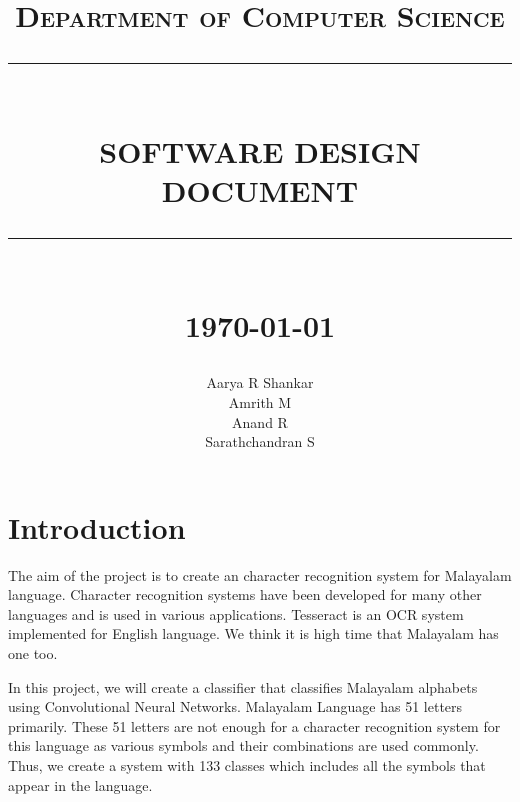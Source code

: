 \documentclass[12pt]{report}
\newcommand{\HRule}[1]{\rule{\linewidth}{#1}}
\begin{document}
\title{ \normalsize \textsc{Department of Computer Science}
		\\ [2.0cm]
		\HRule{0.5pt} \\
		\LARGE \textbf{\uppercase{Software Design Document}}
		\HRule{2pt} \\ [0.5cm]
		\normalsize \today \vspace*{5\baselineskip}}

\date{}

\author{
		Aarya R Shankar \\ 
		Amrith M \\
		Anand R \\
		Sarathchandran S }

\maketitle

\newpage

\sectionfont{\scshape}


\section*{Introduction}
The aim of the project is to create an character recognition system for Malayalam language. Character recognition systems have been developed for many other languages and is used in various applications. Tesseract is an OCR system implemented for English language. We think it is high time that Malayalam has one too.

In this project, we will create a classifier that classifies Malayalam alphabets using Convolutional Neural Networks. Malayalam Language has 51 letters primarily. These 51 letters are not enough for a character recognition system for this language as various symbols and their combinations are used commonly. Thus, we create a system with 133 classes which includes all the symbols that appear in the language. 

\end{document}
